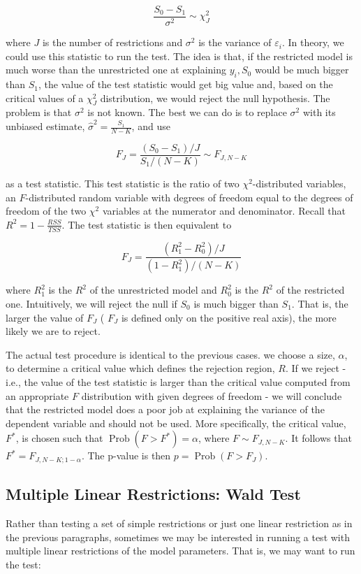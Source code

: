 $$
\frac{S_{0}-S_{1}}{\sigma^{2}} \sim \chi_{J}^{2}
$$

where $J$ is the number of restrictions and $\sigma^{2}$ is the variance of $\varepsilon_{i}$. In theory, we could use this statistic to run the test. The idea is that, if the restricted model is much worse than the unrestricted one at explaining $y_{i}, S_{0}$ would be much bigger than $S_{1}$, the value of the test statistic would get big value and, based on the critical values of a $\chi_{J}^{2}$ distribution, we would reject the null hypothesis. The problem is that $\sigma^{2}$ is not known. The best we can do is to replace $\sigma^{2}$ with its unbiased estimate, $\widehat{\sigma}^{2}=\frac{S_{1}}{N-K}$, and use

$$
F_{J}=\frac{\left(S_{0}-S_{1}\right) / J}{S_{1} /(N-K)} \sim F_{J, N-K}
$$

as a test statistic. This test statistic is the ratio of two $\chi^{2}$-distributed variables, an $F$-distributed random variable with degrees of freedom equal to the degrees of freedom of the two $\chi^{2}$ variables at the numerator and denominator. Recall that $R^{2}=1-\frac{R S S}{T S S}$. The test statistic is then equivalent to

$$
F_{J}=\frac{\left(R_{1}^{2}-R_{0}^{2}\right) / J}{\left(1-R_{1}^{2}\right) /(N-K)}
$$

where $R_{1}^{2}$ is the $R^{2}$ of the unrestricted model and $R_{0}^{2}$ is the $R^{2}$ of the restricted one. Intuitively, we will reject the null if $S_{0}$ is much bigger than $S_{1}$. That is, the larger the value of $F_{J}$ ( $F_{J}$ is defined only on the positive real axis), the more likely we are to reject.

The actual test procedure is identical to the previous cases. we choose a size, $\alpha$, to determine a critical value which defines the rejection region, $R$. If we reject - i.e., the value of the test statistic is larger than the critical value computed from an appropriate $F$ distribution with given degrees of freedom - we will conclude that the restricted model does a poor job at explaining the variance of the dependent variable and should not be used. More specifically, the critical value, $F^{*}$, is chosen such that $\operatorname{Prob}\left(F>F^{*}\right)=\alpha$, where $F \sim F_{J, N-K}$. It follows that $F^{*}=F_{J, N-K ; 1-\alpha}$. The p-value is then $p=\operatorname{Prob}\left(F>F_{J}\right)$.

\subsection{Multiple Linear Restrictions: Wald Test}
Rather than testing a set of simple restrictions or just one linear restriction as in the previous paragraphs, sometimes we may be interested in running a test
with multiple linear restrictions of the model parameters. That is, we may want to run the test:

